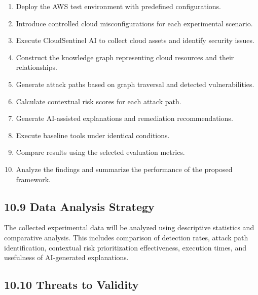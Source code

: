 \begin{enumerate}
\def\labelenumi{\arabic{enumi}.}
\tightlist
\item
  Deploy the AWS test environment with predefined configurations.\\
\item
  Introduce controlled cloud misconfigurations for each experimental scenario.\\
\item
  Execute CloudSentinel AI to collect cloud assets and identify security issues.\\
\item
  Construct the knowledge graph representing cloud resources and their relationships.\\
\item
  Generate attack paths based on graph traversal and detected vulnerabilities.\\
\item
  Calculate contextual risk scores for each attack path.\\
\item
  Generate AI-assisted explanations and remediation recommendations.\\
\item
  Execute baseline tools under identical conditions.\\
\item
  Compare results using the selected evaluation metrics.\\
\item
  Analyze the findings and summarize the performance of the proposed framework.
\end{enumerate}

\subsection{10.9 Data Analysis Strategy}

The collected experimental data will be analyzed using descriptive statistics and comparative analysis. This includes comparison of detection rates, attack path identification, contextual risk prioritization effectiveness, execution times, and usefulness of AI-generated explanations.

\subsection{10.10 Threats to Validity}

